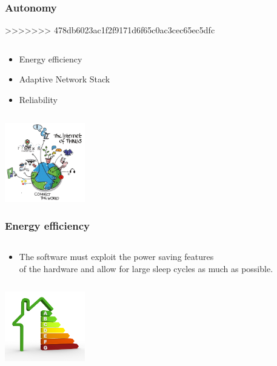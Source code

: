 \documentclass{beamer}
\begin{document}
\begin{frame}
	\frametitle{Autonomy}
>>>>>>> 478db6023ac1f2f9171d6f65c0ac3cec65ec5dfc
	\begin{columns}[c]
		\begin{column}{30cm}
			\vspace{.1cm}
			\begin{itemize}
				\justifying
				\item Energy efficiency
				\item Adaptive Network Stack
				\item Reliability
			\end{itemize}
		\end{column}
	\end{columns}
	\hspace*{7cm} \includegraphics[width=3.5cm]{figs/Internet-of-Things-3.jpg}
\end{frame}

\begin{frame}
	\frametitle{Energy efficiency}
	\begin{columns}[c]
		\begin{column}{30cm}
			\vspace{.1cm}
			\begin{itemize}
				\justifying
				\item The software must exploit the power saving features\\
				of the hardware and allow for large sleep
				cycles as much as possible.
			\end{itemize}
		\end{column}
	\end{columns}
	\vspace{1cm}
	\hspace*{7cm} \includegraphics[width=3.5cm]{figs/Energy-efficiency.jpg}
\end{frame}
\end{document}
